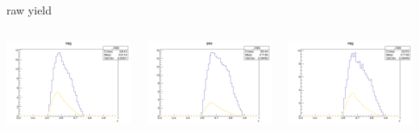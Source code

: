 \begin{frame}{raw yield}
\begin{columns}
\begin{column}[T]{0.25\textwidth}
\includegraphics[width = \textwidth]{results/yield/statistics/yield_x_Q2_z_0.35_4.000_0.60_neg.png}
\end{column}
\begin{column}[T]{0.25\textwidth}
\includegraphics[width = \textwidth]{results/yield/statistics/yield_x_Q2_z_0.35_4.000_0.70_pos.png}
\end{column}
\begin{column}[T]{0.25\textwidth}
\includegraphics[width = \textwidth]{results/yield/statistics/yield_x_Q2_z_0.35_4.000_0.70_neg.png}
\end{column}
\end{columns}
\end{frame}

